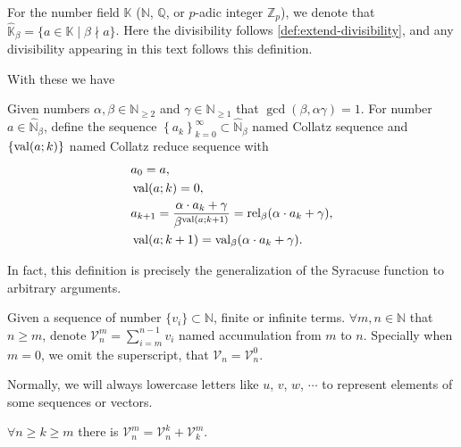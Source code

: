\begin{definition}\label{def:exclude-beta-times}
    For the number field $\mathbb{K}$ ($\mathbb{N}$, $\mathbb{Q}$, or $p$-adic integer $\mathbb{Z}_{p}$), we denote that $\widehat{\mathbb{K}}_{{\beta}} = \{a \in\mathbb{K} \mid \beta \nmid a\}$.
    Here the divisibility follows \cref{def:extend-divisibility}, and any divisibility appearing in this text follows this definition.
\end{definition}
With these we have
\begin{definition}\label{definition:collatz-sequence}
    Given numbers $\alpha, \beta\in \mathbb{N}_{\ge2}$ and $\gamma \in\mathbb{N}_{\ge 1}$ that $\gcd(\beta, \alpha\gamma) = 1$.\newline
    For number $a \in \widehat{\mathbb{N}}_{{\beta}}$, define the sequence $\left\{a_{k}\right\}_{k = 0}^{\infty} \subset \widehat{\mathbb{N}}_{{\beta}}$ named Collatz sequence and $\{\operatorname{val}(a;k)\}$ named Collatz reduce sequence with
    \begin{align*}
        &a_0=a, \\
        &\operatorname{val}(a;k) = 0, \\
        &a_{k+1} = \frac{\alpha\cdot a_{k} + \gamma}{\beta^{\operatorname{val}(a;k + 1)}} = \operatorname{rel}_{\beta}(\alpha\cdot a_{k} + \gamma), \\
        &\operatorname{val}(a;k+1) = \operatorname{val}_{\beta}(\alpha\cdot a_k + \gamma).
    \end{align*}
\end{definition}
In fact, this definition is precisely the generalization of the Syracuse function\cite{wikipediaCollatzConjecture} to arbitrary arguments. 
\begin{definition}\label{def:collatz-accumulation}
    Given a sequence of number $\{v_{i}\}\subset\mathbb{N}$, finite or infinite terms. $\forall m, n \in \mathbb{N}$ that $n \ge m$, denote $\mathcal{V}_{n}^{m} = \sum_{i=m}^{n-1}v_{i}$ named accumulation from $m$ to $n$.
    Specially when $m = 0$, we omit the superscript, that $\mathcal{V}_n = \mathcal{V}_n^{0}$.
\end{definition}
Normally, we will always lowercase letters like $u$, $v$, $w$, $\cdots$ to represent elements of some sequences or vectors.
\begin{proposition}
    $\forall n \ge k \ge m$ there is $\mathcal{V}_n^m = \mathcal{V}_n^{k} + \mathcal{V}_k^{m}$.
\end{proposition}

